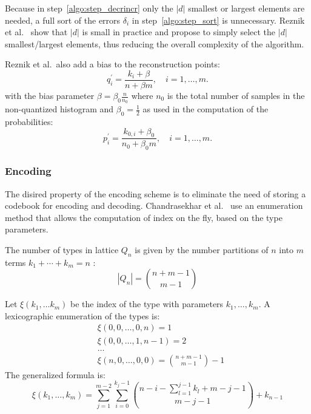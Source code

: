 Because in step~\ref{algo:step_decrincr} only the $\left|d\right|$ smallest or largest elements are needed, a full sort of the errors $\delta_i$ in step~\ref{algo:step_sort} is unnecessary. Reznik et al.\ \cite{fastchog} show that $\left|d\right|$ is small in practice and propose to simply select the $\left|d\right|$ smallest/largest elements, thus reducing the overall complexity of the algorithm.

Reznik et al.\ also add a bias to the reconstruction points:
\begin{equation}
    q_i^\prime = \frac{k_i + \beta}{n + \beta m}, \quad i = 1,\ldots,m.
\end{equation}
with the bias parameter $\beta = \beta_0\frac{n}{n_0}$ where $n_0$ is the total number of samples in the non-quantized histogram and $\beta_0 = \frac{1}{2}$ as used in the computation of the probabilities:
\begin{equation}
    p_i^\prime = \frac{k_{0,i} + \beta_0}{n_0 + \beta_0 m}, \quad i = 1,\ldots,m.
\end{equation}

\subsubsection{Encoding}

The disired property of the encoding scheme is to eliminate the need of storing a codebook for encoding and decoding. Chandrasekhar et al.\ \cite{chog2011} use an enumeration method that allows the computation of index on the fly, based on the type parameters.

The number of types in lattice $Q_n$ is given by the number partitions of $n$ into $m$ terms $k_1 + \cdots  + k_m = n$ \cite{chog2011}:
\begin{equation}
\left|Q_n\right| = {n+m-1 \choose m-1}
\end{equation}

Let $\xi(k_1, \ldots k_m)$ be the index of the type with parameters $k_1, \ldots, k_m$. A lexicographic enumeration of the types is:
\begin{align*}
&\xi(0,0,\ldots,0,n) = 1 \\
&\xi(0,0,\ldots,1,n-1) = 2 \\
&\ldots \\
&\xi(n,0,\ldots,0,0) = {n+m-1 \choose m-1} - 1
\end{align*}
The generalized formula \cite{chog2011} is:
\begin{equation}
\xi(k_1, \ldots, k_m) = \sum_{j=1}^{m-2} \sum_{i=0}^{k_j - 1} {n-i-\sum_{l=1}^{j-1}k_l+m-j-1 \choose m-j-1} + k_{n-1}
\end{equation}

